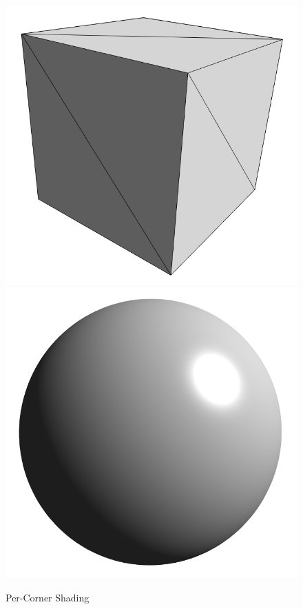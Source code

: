 \documentclass[11pt]{amsart}
\begin{document}
\begin{figure}[h!]
   \centering
   \includegraphics[scale=0.18]{cube_corner.png} %
\hspace{3cm}
   \includegraphics[scale=0.18]{sphere_corner} %
   \caption{Per-Corner Shading}
   \label{fig:per_corner_shading}
\end{figure}
\end{document}
